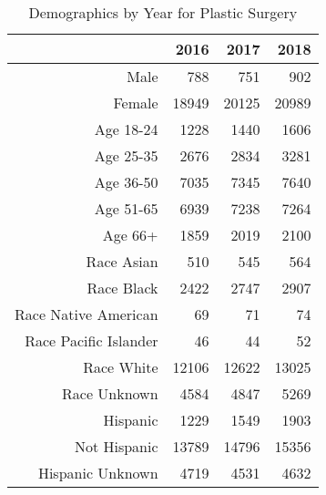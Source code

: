 \begin{table}[ht]
\centering
\begin{tabular}{rrrr}
  \hline
 & 2016 & 2017 & 2018 \\ 
  \hline
Male & 788 & 751 & 902 \\ 
  Female & 18949 & 20125 & 20989 \\ 
  Age 18-24 & 1228 & 1440 & 1606 \\ 
  Age 25-35 & 2676 & 2834 & 3281 \\ 
  Age 36-50 & 7035 & 7345 & 7640 \\ 
  Age 51-65 & 6939 & 7238 & 7264 \\ 
  Age 66+ & 1859 & 2019 & 2100 \\ 
  Race Asian & 510 & 545 & 564 \\ 
  Race Black & 2422 & 2747 & 2907 \\ 
  Race Native American &  69 &  71 &  74 \\ 
  Race Pacific Islander &  46 &  44 &  52 \\ 
  Race White & 12106 & 12622 & 13025 \\ 
  Race Unknown & 4584 & 4847 & 5269 \\ 
  Hispanic & 1229 & 1549 & 1903 \\ 
  Not Hispanic & 13789 & 14796 & 15356 \\ 
  Hispanic Unknown & 4719 & 4531 & 4632 \\ 
   \hline
\end{tabular}
\caption{Demographics by Year for Plastic Surgery} 
\end{table}
